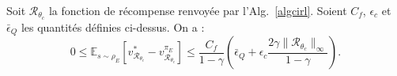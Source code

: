 \documentclass[french,utf8]{./hermes-journal}
\newcommand{\R}{\mathcal{R}}
\newcommand{\E}{\mathbb{E}}
\begin{document}
\begin{theorem}
  \label{th}
  Soit $\R_{\theta_c}$ la fonction de récompense renvoyée par l'Alg.~\ref{algcirl}. Soient $C_f$, $\epsilon_c$
  et $\bar{\epsilon}_Q$ les quantités définies ci-dessus. On a :
  \begin{equation}
    0\leq
    \E_{s\sim\rho_E}[v^*_{\R_{\theta_c}}-v^{\pi_E}_{\R_{\theta_c}}]
    \leq \frac{C_f}{1-\gamma}\left(\bar{\epsilon}_Q +
    \epsilon_c\frac{2\gamma\|\R_{\theta_c}\|_\infty}{1-\gamma}
    \right).
  \end{equation}
\end{theorem}
\end{document}
